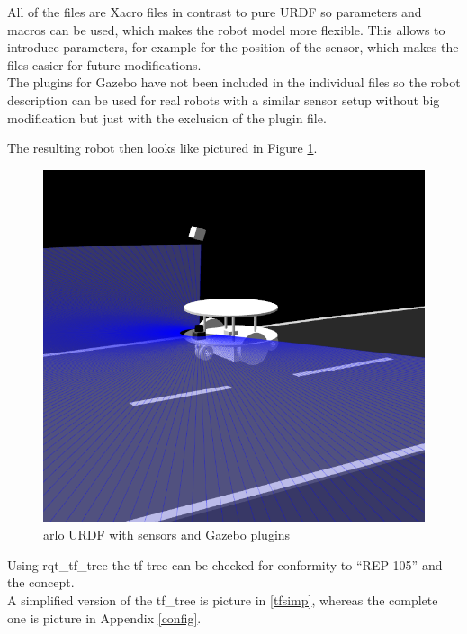 All of the files are Xacro files in contrast to pure URDF so parameters and macros can be used, which makes the robot model more flexible. This allows to introduce parameters, for example for the position of the sensor, which makes the files easier for future modifications.\\

The plugins for Gazebo have not been included in the individual files so the robot description can be used for real robots with a similar sensor setup without big modification but just with the exclusion of the plugin file.

The resulting robot then looks like pictured in Figure \ref{arlourdf}.

\begin{figure}[H]
	\includegraphics[width=\textwidth]{Pictures/arlourdf}
	\caption{arlo URDF with sensors and Gazebo plugins}
	\label{arlourdf}
\end{figure}


Using rqt\_tf\_tree the tf tree can be checked for conformity to ``REP 105'' and the concept.\\ 

A simplified version of the tf\_tree is picture in \ref{tfsimp}, whereas the complete one is picture in Appendix \ref{config}.\\

